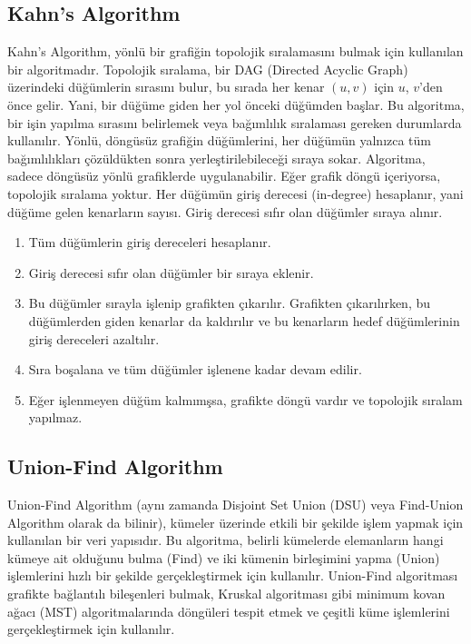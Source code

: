 \newpage

\subsection{Kahn's Algorithm}

Kahn's Algorithm, yönlü bir grafiğin topolojik sıralamasını bulmak için kullanılan bir algoritmadır. Topolojik sıralama, bir DAG (Directed Acyclic Graph) üzerindeki düğümlerin sırasını bulur, bu sırada her kenar $(u, v)$ için $u$, $v$'den önce gelir. Yani, bir düğüme giden her yol önceki düğümden başlar. Bu algoritma, bir işin yapılma sırasını belirlemek veya bağımlılık sıralaması gereken durumlarda kullanılır. Yönlü, döngüsüz grafiğin düğümlerini, her düğümün yalnızca tüm bağımlılıkları çözüldükten sonra yerleştirilebileceği sıraya sokar. Algoritma, sadece döngüsüz yönlü grafiklerde uygulanabilir. Eğer grafik döngü içeriyorsa, topolojik sıralama yoktur. Her düğümün giriş derecesi (in-degree) hesaplanır, yani düğüme gelen kenarların sayısı. Giriş derecesi sıfır olan düğümler sıraya alınır.

\begin{enumerate}
    \item Tüm düğümlerin giriş dereceleri hesaplanır.
    \item Giriş derecesi sıfır olan düğümler bir sıraya eklenir.
    \item Bu düğümler sırayla işlenip grafikten çıkarılır. Grafikten çıkarılırken, bu düğümlerden giden kenarlar da kaldırılır ve bu kenarların hedef düğümlerinin giriş dereceleri azaltılır.
    \item Sıra boşalana ve tüm düğümler işlenene kadar devam edilir.
    \item Eğer işlenmeyen düğüm kalmımşsa, grafikte döngü vardır ve topolojik sıralam yapılmaz.
\end{enumerate}

\newpage

\subsection{Union-Find Algorithm}

Union-Find Algorithm (aynı zamanda Disjoint Set Union (DSU) veya Find-Union Algorithm olarak da bilinir), kümeler üzerinde etkili bir şekilde işlem yapmak için kullanılan bir veri yapısıdır. Bu algoritma, belirli kümelerde elemanların hangi kümeye ait olduğunu bulma (Find) ve iki kümenin birleşimini yapma (Union) işlemlerini hızlı bir şekilde gerçekleştirmek için kullanılır. Union-Find algoritması grafikte bağlantılı bileşenleri bulmak, Kruskal algoritması gibi minimum kovan ağacı (MST) algoritmalarında döngüleri tespit etmek ve çeşitli küme işlemlerini gerçekleştirmek için kullanılır.

